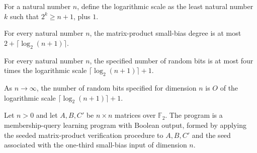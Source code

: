 \begin{definition}
\label{FABL.matrixProductSmallBiasLogScale}
\leanok
For a natural number $n$, define the logarithmic scale as the least natural number $k$
such that $2^k\ge n+1$, plus $1$.
\end{definition}

\begin{theorem}
\label{FABL.matrixProductSmallBiasDegree_le}
\leanok
{}
For every natural number $n$, the matrix-product small-bias degree is at most
$2+\lceil\log_2(n+1)\rceil$.
\end{theorem}

\begin{theorem}
\label{FABL.matrixProductSmallBiasRandomBits_le}
\leanok
{}
For every natural number $n$, the specified number of random bits is at most four times
the logarithmic scale $\lceil\log_2(n+1)\rceil+1$.
\end{theorem}

\begin{theorem}
\label{FABL.matrixProductSmallBiasRandomBits_isBigO}
\leanok
{}
As $n\to\infty$, the number of random bits specified for dimension $n$ is $O$ of the
logarithmic scale $\lceil\log_2(n+1)\rceil+1$.
\end{theorem}

\begin{definition}
\label{FABL.matrixProductOneThirdSmallBiasVerificationProgram}
\leanok
{}
Let $n>0$ and let $A,B,C'$ be $n\times n$ matrices over $\mathbb{F}_2$. The program is a
membership-query learning program with Boolean output, formed by applying the seeded
matrix-product verification procedure to $A,B,C'$ and the seed associated with the
one-third small-bias input of dimension $n$.
\end{definition}

